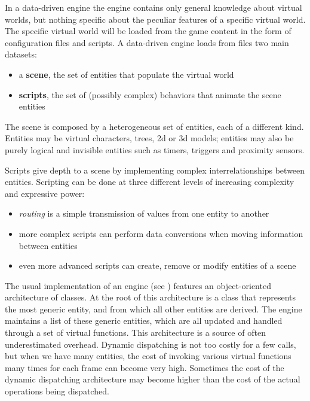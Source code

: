In a data-driven engine the engine contains only general knowledge about virtual worlds, but nothing specific about the peculiar features of a specific virtual world. The specific virtual world will be loaded from the game content in the form of configuration files and scripts. A data-driven engine loads from files two main datasets:

\begin{itemize}
\addtolength{\itemsep}{-0.5\baselineskip}
\item a \textbf{scene}, the set of entities that populate the virtual world
\item \textbf{scripts}, the set of (possibly complex) behaviors that animate the scene entities
\end{itemize}

The scene is composed by a heterogeneous set of entities, each of a different kind. Entities may be virtual characters, trees, 2d or 3d models; entities may also be purely logical and invisible entities such as timers, triggers and proximity sensors.

Scripts give depth to a scene by implementing complex interrelationships between entities. Scripting can be done at three different levels of increasing complexity and expressive power:

\begin{itemize}
\addtolength{\itemsep}{-0.5\baselineskip}
\item \textit{routing} is a simple transmission of values from one entity to another
\item more complex scripts can perform data conversions when moving information between entities
\item even more advanced scripts can create, remove or modify entities of a scene
\end{itemize}

The usual implementation of an engine (see \cite{GAME_OO_HIERARCHY}) features an object-oriented architecture of classes. At the root of this architecture is a class that represents the most generic entity, and from which all other entities are derived. The engine maintains a list of these generic entities, which are all updated and handled through a set of virtual functions. This architecture is a source of often underestimated overhead. Dynamic dispatching is not too costly for a few calls, but when we have many entities, the cost of invoking various virtual functions many times for each frame can become very high. Sometimes the cost of the dynamic dispatching architecture may become higher than the cost of the actual operations being dispatched.

